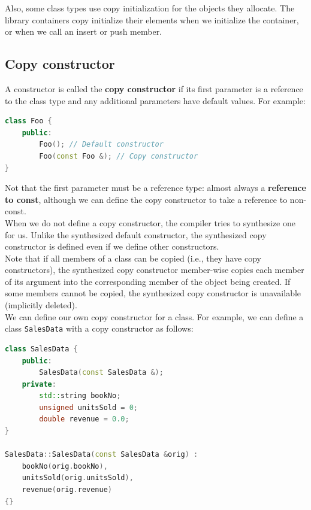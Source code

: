 Also, some class types use copy initialization for the objects they allocate. The library
containers copy initialize their elements when we initialize the container, or when we 
call an insert or push member.

\subsection{Copy constructor}

A constructor is called the \textbf{copy constructor} if its first parameter is a
reference to the class type and any additional parameters have default values.
For example:

\begin{lstlisting}[language=C++]
class Foo {
    public:
        Foo(); // Default constructor
        Foo(const Foo &); // Copy constructor
}
\end{lstlisting}

Not that the first parameter must be a reference type: almost always a \textbf{reference to const},
although we can define the copy constructor to take a reference to non-const.\\

When we do not define a copy constructor, the compiler tries to synthesize one for us.
Unlike the synthesized default constructor, the synthesized copy constructor is defined
even if we define other constructors.\\

Note that if all members of a class can be copied (i.e., they have copy constructors),
the synthesized copy constructor member-wise copies each member of its argument into the
corresponding member of the object being created. If some members cannot be copied, the
synthesized copy constructor is unavailable (implicitly deleted).\\

We can define our own copy constructor for a class. For example, we can define a class
\texttt{SalesData} with a copy constructor as follows:\\

\begin{lstlisting}[language=C++]
class SalesData {
    public:
        SalesData(const SalesData &);
    private:
        std::string bookNo;
        unsigned unitsSold = 0;
        double revenue = 0.0;
}

SalesData::SalesData(const SalesData &orig) : 
    bookNo(orig.bookNo), 
    unitsSold(orig.unitsSold), 
    revenue(orig.revenue) 
{}
\end{lstlisting}

